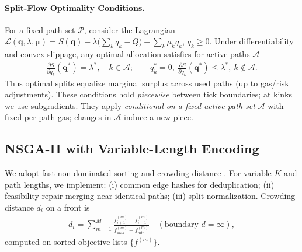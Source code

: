 \documentclass[11pt]{article}
\newcommand{\1}{\mathbf{1}}  %
\begin{document}
\paragraph{Split-Flow Optimality Conditions.} For a fixed path set $\mathcal{P}$, consider the Lagrangian $\mathcal{L}(\mathbf{q},\lambda,\bm{\mu}) = S(\mathbf{q}) - \lambda\big(\sum_k q_k - Q\big) - \sum_k \mu_k q_k$, $q_k\ge0$. Under differentiability and convex slippage, any optimal allocation satisfies for active paths $\mathcal{A}$
\begin{align}
\frac{\partial S}{\partial q_k}(\mathbf{q}^*) = \lambda^*,\quad k\in\mathcal{A}; \qquad q_k^*=0,\ \frac{\partial S}{\partial q_k}(\mathbf{q}^*) \le \lambda^*,\ k\notin\mathcal{A}.
\end{align}
Thus optimal splits equalize marginal surplus across used paths (up to gas/risk adjustments). These conditions hold \emph{piecewise} between tick boundaries; at kinks we use subgradients. They apply \emph{conditional on a fixed active path set} $\mathcal{A}$ with fixed per-path gas; changes in $\mathcal{A}$ induce a new piece.

\subsection{NSGA-II with Variable-Length Encoding}
We adopt fast non-dominated sorting and crowding distance \cite{deb2002nsga2}. For variable $K$ and path lengths, we implement: (i) common edge hashes for deduplication; (ii) feasibility repair merging near-identical paths; (iii) split normalization. Crowding distance $d_i$ on a front is
\begin{align}
 d_i = \sum_{m=1}^{M} \frac{f_{i+1}^{(m)} - f_{i-1}^{(m)}}{f_{\max}^{(m)} - f_{\min}^{(m)}} \quad (\text{boundary } d=\infty),
\end{align}
computed on sorted objective lists $\{f^{(m)}\}$.
\end{document}
